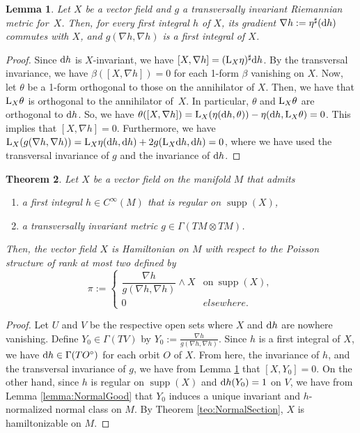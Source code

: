 \documentclass[pdftex]{sigma}%
\newcommand{\dd}{{\rm d}}
\numberwithin{equation}{section}
\newtheorem{Theorem}{Theorem}[section]
\newtheorem{Lemma}[Theorem]{Lemma}
\begin{document}
\begin{Lemma}\label{lemma:TransInv}
Let $X$ be a vector field and $g$ a transversally invariant Riemannian metric for~$X$. Then, for every first integral $h$ of $X$, its gradient $\nabla h:=\eta^{\sharp}(\dd h)$ commutes with $X$, and $g(\nabla h,\nabla h)$ is a first integral of $X$.
\end{Lemma}
\begin{proof}
Since $\dd h$ is $X$-invariant, we have $[X,\nabla h] = ({\rm L}_{X}\eta)^{\sharp}\dd h$. By the transversal invariance, we have $\beta([X,\nabla h])=0$ for each 1-form $\beta$ vanishing on $X$. Now, let $\theta$ be a 1-form orthogonal to those on the annihilator of $X$. Then, we have that ${\rm L}_{X}\theta$ is orthogonal to the annihilator of~$X$. In particular, $\theta$ and ${\rm L}_{X}\theta$ are orthogonal to $\dd h$. So, we have $\theta([X,\nabla h]) = {\rm L}_{X}(\eta(\dd h,\theta)) - \eta(\dd h,{\rm L}_{X}\theta) = 0$. This implies that $[X,\nabla h]=0$. Furthermore, we have ${\rm L}_{X}(g(\nabla h,\nabla h))={\rm L}_{X}\eta(\dd h,\dd h) + 2g({\rm L}_{X}\dd h,\dd h)=0$, where we have used the transversal invariance of $g$ and the invariance of $\dd h$.
\end{proof}

\begin{Theorem}\label{teo:TrInvM}
Let $X$ be a vector field on the manifold $M$ that admits
 \begin{enumerate}\itemsep=0pt
 \item[$1)$] a first integral $h \in C^{\infty}(M)$ that is regular on $\operatorname{supp}(X)$,
 \item[$2)$] a transversally invariant metric $g \in \Gamma(TM \otimes TM)$.
 \end{enumerate}
Then, the vector field $X$ is Hamiltonian on $M$ with respect to the Poisson structure of rank at most two defined by
 \begin{equation*}
 \pi :=
 \begin{cases}
 \dfrac{\nabla h}{g(\nabla h,\nabla h)} \wedge X & \text{on} \ \operatorname{supp}(X), \\
 0 & elsewhere.
 \end{cases}
 \end{equation*}
\end{Theorem}
\begin{proof}
Let $U$ and $V$ be the respective open sets where $X$ and $\dd h$ are nowhere vanishing. Define $Y_0 \in \Gamma(TV)$ by $Y_0 := \frac{\nabla h}{g(\nabla h,\nabla h)}$. Since $h$ is a first integral of $X$, we have $\dd h \in \Gamma(TO^{\circ})$ for each orbit $O$ of $X$. From here, the invariance of $h$, and the transversal invariance of $g$, we have from Lemma \ref{lemma:TransInv} that $[X,Y_0] = 0$. On the other hand, since $h$ is regular on $\operatorname{supp}(X)$ and $\dd h(Y_0) = 1$ on $V$, we have from Lemma \ref{lemma:NormalGood} that $Y_{0}$ induces a unique invariant and $h$-normalized normal class on $M$. By Theorem \ref{teo:NormalSection}, $X$ is hamiltonizable on $M$.
\end{proof}
\end{document}
